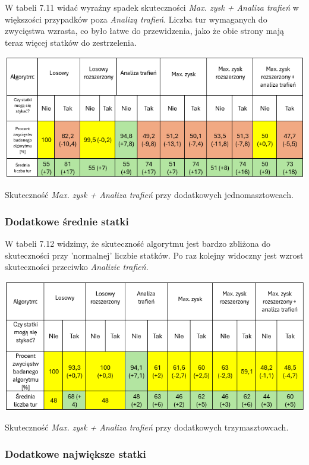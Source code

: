 W tabeli 7.11 widać wyraźny spadek skuteczności \emph{Max. zysk + Analiza trafień} w większości przypadków poza \emph{Analizą trafień}. Liczba tur wymaganych do zwycięstwa wzrasta, co było łatwe do przewidzenia, jako że obie strony mają teraz więcej statków do zestrzelenia.

\begin{table}[!h]
    \label{fig:vs-people}
    \centering \includegraphics[width=0.9\linewidth]{img/shipCountSmallShips.png}
    \caption{Skuteczność \emph{Max. zysk + Analiza trafień} przy dodatkowych jednomasztowcach.}
\end{table}

\subsubsection{Dodatkowe średnie statki}

W tabeli 7.12 widzimy, że skuteczność algorytmu jest bardzo zbliżona do skuteczności przy 'normalnej' liczbie statków. Po raz kolejny widoczny jest wzrost skuteczności przeciwko \emph{Analizie trafień}.

\begin{table}[!h]
    \label{fig:vs-people}
    \centering \includegraphics[width=0.9\linewidth]{img/shipCountMiddleShips.png}
    \caption{Skuteczność \emph{Max. zysk + Analiza trafień} przy dodatkowych trzymasztowcach.}
\end{table}

\subsubsection{Dodatkowe największe statki}

